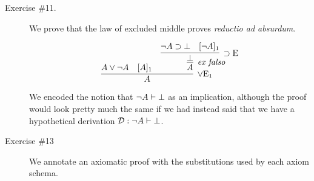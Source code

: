 \documentclass[11pt,letterpaper]{article}
\renewcommand{\implies}{\supset}
\begin{document}
\begin{enumerate}
\begin{description}
      \item[Exercise \#11.]
        We prove that the law of excluded middle proves
        \emph{reductio ad absurdum}.

        \begin{equation*}
          \infer[\lor \text{E}_1]{
            A
          }{
            A \lor \neg A
            &
            [A]_1
            &
            \infer[\text{\emph{ex falso}}]{
              A
            }{
              \infer[\implies \text{E}]{
                \bot
              }{
                \neg A \implies \bot
                &
                [\neg A]_1
              }
            }
          }
        \end{equation*}

        We encoded the notion that $\neg A \vdash \bot$ as an implication,
        although the proof would look pretty much the same if we had instead
        said that we have a hypothetical derivation
        $\mathcal{D} : \neg A \vdash \bot$.

      \item[Exercise \#13]
        We annotate an axiomatic proof with the substitutions used by each
        axiom schema.

        \newcommand{\ann}[1]{\quad\text{#1}}


\end{description}
\end{enumerate}
\end{document}
